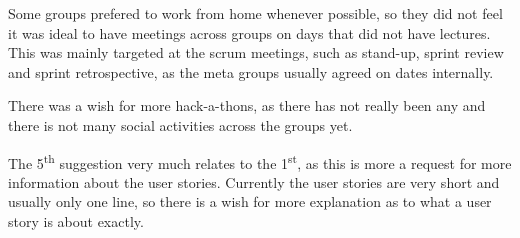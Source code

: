 Some groups prefered to work from home whenever possible, so they did not feel it was ideal to have meetings across groups on days that did not have lectures. 
This was mainly targeted at the scrum meetings, such as stand-up, sprint review and sprint retrospective, as the meta groups usually agreed on dates internally.

There was a wish for more hack-a-thons, as there has not really been any and there is not many social activities across the groups yet. 

The 5\textsuperscript{th} suggestion very much relates to the 1\textsuperscript{st}, as this is more a request for more information about the user stories. 
Currently the user stories are very short and usually only one line, so there is a wish for more explanation as to what a user story is about exactly.

